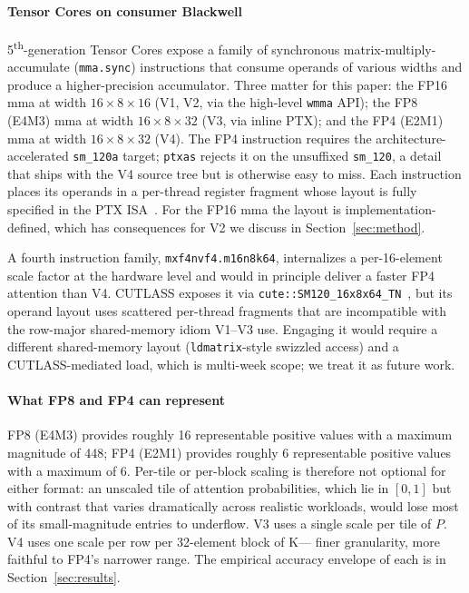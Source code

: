 \documentclass[conference]{IEEEtran}
\begin{document}
\paragraph*{Tensor Cores on consumer Blackwell}
5\textsuperscript{th}-generation Tensor Cores expose a family of
synchronous matrix-multiply-accumulate (\texttt{mma.sync})
instructions that consume operands of various widths and produce a
higher-precision accumulator. Three matter for this paper: the FP16
mma at width $16{\times}8{\times}16$ (V1, V2, via the high-level
\texttt{wmma} API); the FP8 (E4M3) mma at width $16{\times}8{\times}32$
(V3, via inline PTX); and the FP4 (E2M1) mma at width
$16{\times}8{\times}32$ (V4). The FP4 instruction requires the
architecture-accelerated \texttt{sm\_120a} target;
\texttt{ptxas} rejects it on the unsuffixed \texttt{sm\_120}, a
detail that ships with the V4 source tree but is otherwise easy to
miss. Each instruction places its operands in a per-thread register
fragment whose layout is fully specified in the PTX
ISA~\cite{nvidia2024ptxisa}. For the FP16 mma the layout is
implementation-defined, which has consequences for V2 we discuss in
Section~\ref{sec:method}.

A fourth instruction family, \texttt{mxf4nvf4.m16n8k64}, internalizes
a per-16-element scale factor at the hardware level and would in
principle deliver a faster FP4 attention than V4. CUTLASS exposes it
via \texttt{cute::SM120\_16x8x64\_TN}~\cite{nvidia2024cutlass}, but
its operand layout uses scattered per-thread fragments that are
incompatible with the row-major shared-memory idiom V1--V3 use.
Engaging it would require a different shared-memory layout
(\texttt{ldmatrix}-style swizzled access) and a CUTLASS-mediated
load, which is multi-week scope; we treat it as future work.

\paragraph*{What FP8 and FP4 can represent}
FP8 (E4M3) provides roughly 16 representable positive values with a
maximum magnitude of 448; FP4 (E2M1) provides roughly 6 representable
positive values with a maximum of 6. Per-tile or per-block scaling is
therefore not optional for either format: an unscaled tile of
attention probabilities, which lie in $[0,1]$ but with contrast that
varies dramatically across realistic workloads, would lose most of
its small-magnitude entries to underflow. V3 uses a single scale per
tile of $P$. V4 uses one scale per row per 32-element block of K---
finer granularity, more faithful to FP4's narrower range. The
empirical accuracy envelope of each is in Section~\ref{sec:results}.
\end{document}
